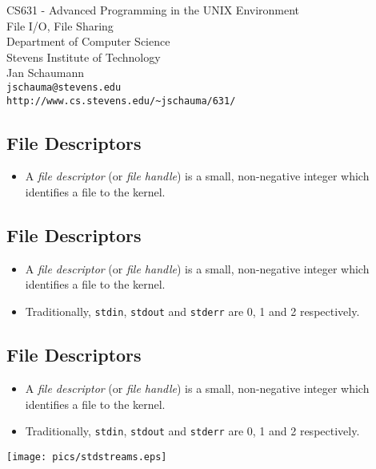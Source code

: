 \documentclass[xga]{xdvislides}
\begin{document}
\setfontphv

\lhead{\slidetitle}
\rhead{\relax}
\cfoot{\relax}
\rfoot{\Gray{\today}}

\vspace*{\fill}
\begin{center}
	\Hugesize
		CS631 - Advanced Programming in the UNIX Environment\\ [1em]
		File I/O, File Sharing
	\hspace*{5mm}\blueline\\ [1em]
	\Normalsize
		Department of Computer Science\\
		Stevens Institute of Technology\\
		Jan Schaumann\\
		\verb+jschauma@stevens.edu+\\
		\verb+http://www.cs.stevens.edu/~jschauma/631/+
\end{center}
\vspace*{\fill}

\subsection{File Descriptors}
\begin{itemize}
	\item A {\em file descriptor} (or {\em file handle}) is a small,
		non-negative integer which identifies a file to the kernel.
\end{itemize}


\subsection{File Descriptors}
\begin{itemize}
	\item A {\em file descriptor} (or {\em file handle}) is a small,
		non-negative integer which identifies a file to the kernel.
	\item Traditionally, {\tt stdin}, {\tt stdout} and {\tt stderr}
		are 0, 1 and 2 respectively.
\end{itemize}

\subsection{File Descriptors}
\begin{itemize}
	\item A {\em file descriptor} (or {\em file handle}) is a small,
		non-negative integer which identifies a file to the kernel.
	\item Traditionally, {\tt stdin}, {\tt stdout} and {\tt stderr}
		are 0, 1 and 2 respectively.
\end{itemize}
\texttt{[image: pics/stdstreams.eps]}
\end{document}
